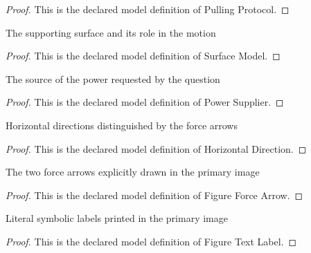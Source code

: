 \begin{proof}
  This is the declared model definition of Pulling Protocol.
\end{proof}
\begin{definition}
  \label{def:physics:phyx-mini-0695:phyxminiproblems-problemphyxmini0695-surfacemodel}
  The supporting surface and its role in the motion
\end{definition}
\begin{proof}
  This is the declared model definition of Surface Model.
\end{proof}
\begin{definition}
  \label{def:physics:phyx-mini-0695:phyxminiproblems-problemphyxmini0695-powersupplier}
  The source of the power requested by the question
\end{definition}
\begin{proof}
  This is the declared model definition of Power Supplier.
\end{proof}
\begin{definition}
  \label{def:physics:phyx-mini-0695:phyxminiproblems-problemphyxmini0695-horizontaldirection}
  Horizontal directions distinguished by the force arrows
\end{definition}
\begin{proof}
  This is the declared model definition of Horizontal Direction.
\end{proof}
\begin{definition}
  \label{def:physics:phyx-mini-0695:phyxminiproblems-problemphyxmini0695-figureforcearrow}
  The two force arrows explicitly drawn in the primary image
\end{definition}
\begin{proof}
  This is the declared model definition of Figure Force Arrow.
\end{proof}
\begin{definition}
  \label{def:physics:phyx-mini-0695:phyxminiproblems-problemphyxmini0695-figuretextlabel}
  Literal symbolic labels printed in the primary image
\end{definition}
\begin{proof}
  This is the declared model definition of Figure Text Label.
\end{proof}
